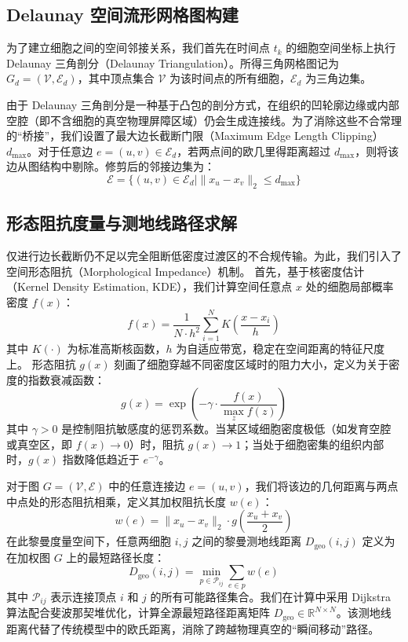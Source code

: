 \subsection{Delaunay 空间流形网格图构建}
为了建立细胞之间的空间邻接关系，我们首先在时间点 $t_k$ 的细胞空间坐标上执行 Delaunay 三角剖分（Delaunay Triangulation）\cite{Delaunay1934}。所得三角网格图记为 $G_d = (\mathcal{V}, \mathcal{E}_d)$，其中顶点集合 $\mathcal{V}$ 为该时间点的所有细胞，$\mathcal{E}_d$ 为三角边集。

由于 Delaunay 三角剖分是一种基于凸包的剖分方式，在组织的凹轮廓边缘或内部空腔（即不含细胞的真空物理屏障区域）仍会生成连接线。为了消除这些不合常理的“桥接”，我们设置了最大边长截断门限（Maximum Edge Length Clipping）$d_{\text{max}}$。对于任意边 $e = (u, v) \in \mathcal{E}_d$，若两点间的欧几里得距离超过 $d_{\text{max}}$，则将该边从图结构中剔除。修剪后的邻接边集为：
\begin{equation}
    \mathcal{E} = \{ (u, v) \in \mathcal{E}_d \mid \|x_u - x_v\|_2 \le d_{\text{max}} \}
\end{equation}

\subsection{形态阻抗度量与测地线路径求解}
仅进行边长截断仍不足以完全阻断低密度过渡区的不合规传输。为此，我们引入了空间形态阻抗（Morphological Impedance）机制。
首先，基于核密度估计（Kernel Density Estimation, KDE）\cite{Parzen1962}，我们计算空间任意点 $x$ 处的细胞局部概率密度 $f(x)$：
\begin{equation}
    f(x) = \frac{1}{N \cdot h^2} \sum_{i=1}^N K\left(\frac{x - x_i}{h}\right)
\end{equation}
其中 $K(\cdot)$ 为标准高斯核函数，$h$ 为自适应带宽，稳定在空间距离的特征尺度上。
形态阻抗 $g(x)$ 刻画了细胞穿越不同密度区域时的阻力大小，定义为关于密度的指数衰减函数：
\begin{equation}
    g(x) = \exp\left(-\gamma \cdot \frac{f(x)}{\max_z f(z)}\right)
\end{equation}
其中 $\gamma > 0$ 是控制阻抗敏感度的惩罚系数。当某区域细胞密度极低（如发育空腔或真空区，即 $f(x) \to 0$）时，阻抗 $g(x) \to 1$；当处于细胞密集的组织内部时，$g(x)$ 指数降低趋近于 $e^{-\gamma}$。

对于图 $G = (\mathcal{V}, \mathcal{E})$ 中的任意连接边 $e = (u, v)$，我们将该边的几何距离与两点中点处的形态阻抗相乘，定义其加权阻抗长度 $w(e)$：
\begin{equation}
    w(e) = \|x_u - x_v\|_2 \cdot g\left(\frac{x_u + x_v}{2}\right)
\end{equation}
在此黎曼度量空间下，任意两细胞 $i, j$ 之间的黎曼测地线距离 $D_{\text{geo}}(i, j)$ 定义为在加权图 $G$ 上的最短路径长度：
\begin{equation}
    D_{\text{geo}}(i, j) = \min_{p \in \mathcal{P}_{ij}} \sum_{e \in p} w(e)
\end{equation}
其中 $\mathcal{P}_{ij}$ 表示连接顶点 $i$ 和 $j$ 的所有可能路径集合。我们在计算中采用 Dijkstra 算法\cite{Dijkstra1959}配合斐波那契堆优化，计算全源最短路径距离矩阵 $D_{\text{geo}} \in \mathbb{R}^{N \times N}$。该测地线距离代替了传统模型中的欧氏距离，消除了跨越物理真空的“瞬间移动”路径。

